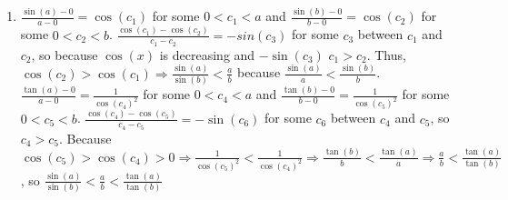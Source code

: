 \documentclass[10pt]{article}
\begin{document}
\begin{enumerate}[label= (Q-\arabic*)]
        \item $\frac{\sin(a)-0}{a-0}=\cos(c_1)$ for some $0<c_1<a$ and $\frac{\sin(b)-0}{b-0}=\cos(c_2)$ for some $0<c_2<b$. $\frac{\cos(c_1)-\cos(c_2)}{c_1-c_2}=-sin(c_3)$ for some $c_3$ between $c_1$ and $c_2$, so because $\cos(x)$ is decreasing and $-\sin(c_3)$ $c_1>c_2$. Thus, $\cos(c_2)>\cos(c_1)\Rightarrow\frac{\sin(a)}{\sin(b)}<\frac{a}{b}$ because $\frac{\sin(a)}{a}<\frac{\sin(b)}{b}$.
        $\frac{\tan(a)-0}{a-0}=\frac{1}{{\cos(c_4)}^2}$ for some $0<c_4<a$ and $\frac{\tan(b)-0}{b-0}=\frac{1}{{\cos(c_5)}^2}$ for some $0<c_5<b$. $\frac{\cos(c_4)-\cos(c_5)}{c_4-c_5}=-\sin(c_6)$ for some $c_6$ between $c_4$ and $c_5$, so $c_4>c_5$. Because $\cos(c_5)>\cos(c_4)>0\Rightarrow \frac{1}{{\cos(c_5)}^2}<\frac{1}{{\cos(c_4)}^2}\Rightarrow\frac{\tan(b)}{b}<\frac{\tan(a)}{a}\Rightarrow\frac{a}{b}<\frac{\tan(a)}{\tan(b)}$, so $\frac{\sin(a)}{\sin(b)}<\frac{a}{b}<\frac{\tan(a)}{\tan(b)}$
\end{enumerate}
\end{document}
